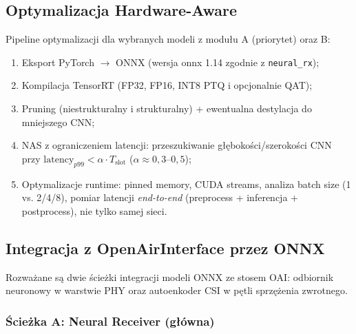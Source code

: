 \documentclass[12pt, a4paper]{article}
\begin{document}
\subsection{Optymalizacja Hardware-Aware}

Pipeline optymalizacji dla wybranych modeli z modułu A (priorytet) oraz B:
\begin{enumerate}[label=\arabic*), leftmargin=*]
    \item Eksport PyTorch $\rightarrow$ ONNX (wersja onnx 1.14 zgodnie z \texttt{neural\_rx});
    \item Kompilacja TensorRT (FP32, FP16, INT8 PTQ i opcjonalnie QAT);
    \item Pruning (niestrukturalny i strukturalny) + ewentualna destylacja do mniejszego CNN;
    \item NAS z ograniczeniem latencji: przeszukiwanie głębokości/szerokości CNN przy $\mathrm{latency}_{p99} < \alpha \cdot T_{\mathrm{slot}}$ ($\alpha \approx 0{,}3$--$0{,}5$);
    \item Optymalizacje runtime: pinned memory, CUDA streams, analiza batch size (1 vs. 2/4/8), pomiar latencji \emph{end-to-end} (preprocess + inferencja + postprocess), nie tylko samej sieci.
\end{enumerate}

\subsection{Integracja z OpenAirInterface przez ONNX}
\label{sec:oai-onnx}

Rozważane są dwie ścieżki integracji modeli ONNX ze stosem OAI: odbiornik neuronowy w warstwie PHY oraz autoenkoder CSI w pętli sprzężenia zwrotnego.

\subsubsection{Ścieżka A: Neural Receiver (główna)}
\end{document}

